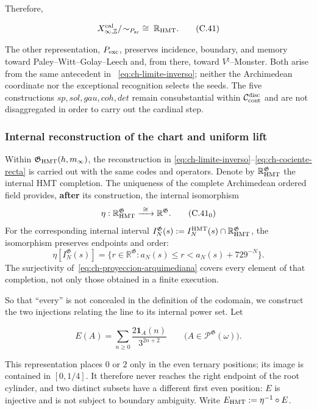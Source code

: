 Therefore,

\[
 X_{\infty,\mathbb Z}^{\rm cal}/\!\sim_{P_{\rm ar}}
 \;\cong\;\mathbb R_{\rm HMT}.
\tag{C.41}\label{eq:ch-cociente-recta}
\]

The other representation, \(P_{\rm exc}\), preserves incidence, boundary, and
memory toward Paley--\allowbreak Witt--\allowbreak Golay--\allowbreak Leech and, from there, toward
\(V^\natural\)--Monster. Both arise from the same antecedent in
~\eqref{eq:ch-limite-inverso}; neither the Archimedean coordinate nor the
exceptional recognition selects the seeds. The five constructions
\(sp,sol,gau,coh,det\) remain consubstantial within
\(\mathcal C_{\rm cont}^{\rm disc}\) and are not disaggregated in order to
carry out the cardinal step.



\subsubsection{Internal reconstruction of the chart and uniform lift}

Within \(\mathfrak G_{\rm HMT}(h,m_\infty)\), the reconstruction in
\eqref{eq:ch-limite-inverso}--\eqref{eq:ch-cociente-recta} is carried out with
the same codes and operators. Denote by
\(\mathbb R_{\rm HMT}^{\mathfrak G}\) the internal HMT completion. The
uniqueness of the complete Archimedean ordered field provides, \textbf{after}
its construction, the internal isomorphism
\[
 \eta:\mathbb R_{\rm HMT}^{\mathfrak G}
 \xrightarrow{\ \cong\ }\mathbb R^{\mathfrak G}.
\tag{C.41$_0$}\label{eq:ch-isomorfismo-interno}
\]
For the corresponding internal interval
\(I_N^{\mathfrak G}(s):=
 I_N^{\rm HMT}(s)\cap\mathbb R_{\rm HMT}^{\mathfrak G}\), the isomorphism
preserves endpoints and order:
\[
 \eta[I_N^{\mathfrak G}(s)]
 =\{r\in\mathbb R^{\mathfrak G}:
      a_N(s)\le r<a_N(s)+729^{-N}\}.
\tag{C.41$_0$a}\label{eq:ch-intervalos-internos}
\]
The surjectivity of~\eqref{eq:ch-proyeccion-arquimediana} covers every element
of that completion, not only those obtained in a finite execution.

So that “every” is not concealed in the definition of the codomain, we
construct the two injections relating the line to its internal power set. Let

\[
 E(A)=\sum_{n\ge0}\frac{2\mathbf1_A(n)}{3^{2n+2}}
 \qquad
 \bigl(A\in\mathcal P^{\mathfrak G}(\omega)\bigr).
\tag{C.41a}\label{eq:ch-incrustacion-cantor}
\]

This representation places \(0\) or \(2\) only in the even ternary positions;
its image is contained in \([0,1/4]\). It therefore never reaches the right
endpoint of the root cylinder, and two distinct subsets have a different first
even position: \(E\) is injective and is not subject to boundary ambiguity.
Write \(E_{\rm HMT}:=\eta^{-1}\circ E\).

